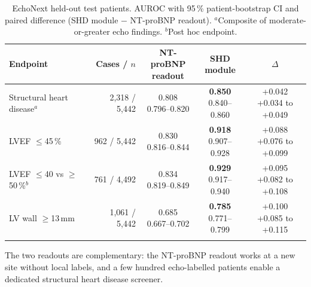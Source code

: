 \documentclass[10pt]{article}
\begin{document}
\begin{table}[t]\centering\small
\caption{EchoNext held-out test patients. AUROC with 95\,\% patient-bootstrap CI and paired difference (SHD module $-$ NT-proBNP readout). $^a$Composite of moderate-or-greater echo findings. $^b$Post hoc endpoint.}\label{tab:echo}
\setlength\tabcolsep{4pt}\footnotesize
\begin{tabular}{lrccc}\toprule
Endpoint & Cases / $n$ & \makecell{NT-proBNP\\readout} & \makecell{SHD\\module} & $\Delta$ \\\midrule
Structural heart disease$^a$ & 2{,}318 / 5{,}442 & \makecell{0.808\\ {\scriptsize 0.796--0.820}} & \makecell{\textbf{0.850}\\ {\scriptsize 0.840--0.860}} & \makecell{+0.042\\ {\scriptsize +0.034 to +0.049}} \\ \addlinespace[2pt]
LVEF $\le$45\,\% & 962 / 5{,}442 & \makecell{0.830\\ {\scriptsize 0.816--0.844}} & \makecell{\textbf{0.918}\\ {\scriptsize 0.907--0.928}} & \makecell{+0.088\\ {\scriptsize +0.076 to +0.099}} \\ \addlinespace[2pt]
LVEF $\le$40 vs $\ge$50\,\%$^b$ & 761 / 4{,}492 & \makecell{0.834\\ {\scriptsize 0.819--0.849}} & \makecell{\textbf{0.929}\\ {\scriptsize 0.917--0.940}} & \makecell{+0.095\\ {\scriptsize +0.082 to +0.108}} \\ \addlinespace[2pt]
LV wall $\ge$13\,mm & 1{,}061 / 5{,}442 & \makecell{0.685\\ {\scriptsize 0.667--0.702}} & \makecell{\textbf{0.785}\\ {\scriptsize 0.771--0.799}} & \makecell{+0.100\\ {\scriptsize +0.085 to +0.115}} \\ \addlinespace[2pt]
\bottomrule\end{tabular}\end{table}

The two readouts are complementary: the NT-proBNP readout works at a new site without local labels, and a few hundred echo-labelled patients enable a dedicated structural heart disease screener.
\end{document}
